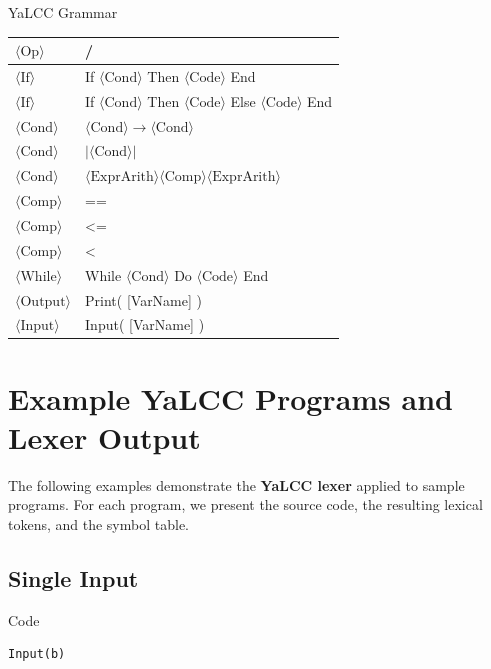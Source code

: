 \documentclass{article}
\begin{document}
\begin{resultbox}{YaLCC Grammar}
\begin{tabularx}{\linewidth}{|l|X|}
\hline
$\langle\text{Op}\rangle$ & / \\
\hline
$\langle\text{If}\rangle$ & If { $\langle\text{Cond}\rangle$ } Then $\langle\text{Code}\rangle$ End \\
\hline
$\langle\text{If}\rangle$ & If { $\langle\text{Cond}\rangle$ } Then $\langle\text{Code}\rangle$ Else $\langle\text{Code}\rangle$ End \\
\hline
$\langle\text{Cond}\rangle$ & $\langle\text{Cond}\rangle \rightarrow \langle\text{Cond}\rangle$ \\
\hline
$\langle\text{Cond}\rangle$ & $|\langle\text{Cond}\rangle|$ \\
\hline
$\langle\text{Cond}\rangle$ & $\langle\text{ExprArith}\rangle \langle\text{Comp}\rangle \langle\text{ExprArith}\rangle$ \\
\hline
$\langle\text{Comp}\rangle$ & == \\
\hline
$\langle\text{Comp}\rangle$ & <= \\
\hline
$\langle\text{Comp}\rangle$ & < \\
\hline
$\langle\text{While}\rangle$ & While { $\langle\text{Cond}\rangle$ } Do $\langle\text{Code}\rangle$ End \\
\hline
$\langle\text{Output}\rangle$ & Print( [VarName] ) \\
\hline
$\langle\text{Input}\rangle$ & Input( [VarName] ) \\
\hline
\end{tabularx}
\end{resultbox}


\newpage

\section{Example YaLCC Programs and Lexer Output}
\label{appendix:example-ycc}

\noindent The following examples demonstrate the \textbf{YaLCC lexer} applied to sample programs. For each program, we present the source code, the resulting lexical tokens, and the symbol table.

\subsection{Single Input}

\begin{resultbox}{Code}
\begin{lstlisting}[style=yalccstyle]
Input(b)
\end{lstlisting}
\end{resultbox}
\end{document}

